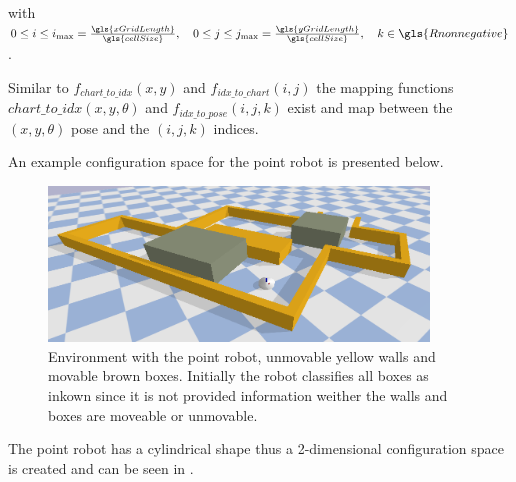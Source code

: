 with $0 \leq i \leq i_{\textrm{max}} = \frac{\gls{xGridLength}}{\gls{cellSize}}, \quad 0 \leq j \leq j_{\textrm{max}} = \frac{\gls{yGridLength}}{\gls{cellSize}}, \quad k \in \gls{Rnonnegative}$.\bs

Similar to $f_\mathit{chart\_to\_idx}(x, y)$ and $f_\mathit{idx\_to\_chart}(i,j)$ the mapping functions $\mathit{chart\_to\_idx}(x, y, \theta)$ and $f_\mathit{idx\_to\_pose}(i, j, k)$ exist and map between the $(x, y, \theta)$ pose and the $(i, j, k)$ indices.\bs

An example configuration space for the point robot is presented below.
\begin{figure}[H]
    \centering
    \includegraphics[width=0.9\textwidth]{figures/required_background/planning/two_push_to_freedom_env}
    \caption{Environment with the point robot, unmovable yellow walls and movable brown boxes. Initially the robot classifies all boxes as inkown since it is not provided information weither the walls and boxes are moveable or unmovable.}%
    \label{fig:two_pushes_to_freedom_env}
\end{figure}

The point robot has a cylindrical shape thus a 2-dimensional configuration space is created and can be seen in .

